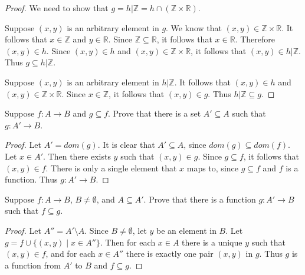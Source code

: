 \begin{proof}
    We need to show that $g = h|\mathbb{Z} = h \cap (\mathbb{Z} \times \mathbb{R})$.
    
    Suppose $(x, y)$ is an arbitrary element in $g$.
    We know that $(x, y) \in \mathbb{Z} \times \mathbb{R}$.
    It follows that $x \in \mathbb{Z}$ and $y \in \mathbb{R}$.
    Since $\mathbb{Z} \subseteq \mathbb{R}$, it follows that $x \in \mathbb{R}$.
    Therefore $(x, y) \in h$.
    Since $(x, y) \in h$ and $(x, y) \in \mathbb{Z} \times \mathbb{R}$,
        it follows that $(x, y) \in h|\mathbb{Z}$.
    Thus $g \subseteq h|\mathbb{Z}$.

    Suppose $(x, y)$ is an arbitrary element in $h|\mathbb{Z}$.
    It follows that $(x, y) \in h$ and $(x, y) \in \mathbb{Z} \times \mathbb{R}$.
    Since $x \in \mathbb{Z}$, it follows that $(x, y) \in g$.
    Thus $h|\mathbb{Z} \subseteq g$.
\end{proof}

\begin{tcolorbox}[title=Problem 8, breakable]
    Suppose $f : A \rightarrow B$ and $g \subseteq f$.
    Prove that there is a set $A' \subseteq A$ such that 
        $g : A' \rightarrow B$.
\end{tcolorbox}

\begin{proof}
    Let $A' = dom(g)$.
    It is clear that $A' \subseteq A$,
        since $dom(g) \subseteq dom(f)$.
    Let $x \in A'$. Then there exists $y$ such that $(x, y) \in g$.
    Since $g \subseteq f$, it follows that $(x, y) \in f$.
    There is only a single element that $x$ maps to,
        since $g \subseteq f$ and $f$ is a function.
    Thus $g : A' \rightarrow B$.
\end{proof}

\begin{tcolorbox}[title=Problem 9, breakable]
    Suppose $f : A \rightarrow B$, $B \ne \emptyset$, and $A \subseteq A'$.
    Prove that there is a function $g : A' \rightarrow B$ such that $f \subseteq g$.
\end{tcolorbox}

\begin{proof}
    Let $A'' = A' \setminus A$.
    Since $B \ne \emptyset$, let $y$ be an element in $B$.
    Let $g = f \cup \{(x, y) \mid x \in A''\}$.
    Then for each $x \in A$ there is a unique $y$ such that $(x, y) \in f$,
    and for each $x \in A''$ there is exactly one pair $(x, y)$ in $g$.
    Thus $g$ is a function from $A'$ to $B$ and $f \subseteq g$.
\end{proof}

